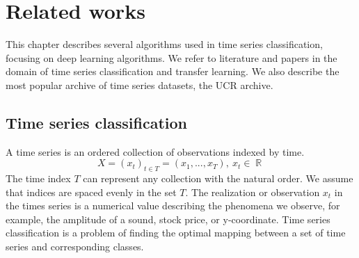 \documentclass[a4paper,11pt,twoside]{report}
\theoremstyle{definition}
\DeclareMathOperator{\real}{\mathbb{R}}
\begin{document}
\chapter{Related works}
This chapter describes several algorithms used in time series classification, focusing on deep learning algorithms. We refer to literature and papers in the domain of time series classification and transfer learning. We also describe the most popular archive of time series datasets, the UCR archive.

\section{Time series classification}
A time series is an ordered collection of observations indexed by time.
$$X = (x_t)_{t\in T} = (x_1, ... , x_T),\ x_t\in \real$$
The time index $T$ can represent any collection with the natural order. We assume that indices are spaced evenly in the set $T$. The realization or observation $x_t$ in the times series is a numerical value describing the phenomena we observe, for example, the amplitude of a sound, stock price, or y-coordinate. Time series classification is a problem of finding the optimal mapping between a set of time series and corresponding classes.
\end{document}
